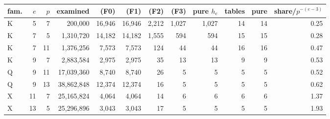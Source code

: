 \begin{tabular}{@{}lrrrrrrrrrrr@{}}
\toprule
fam. & $e$ & $p$ & examined & (F0) & (F1) & (F2) & (F3) & pure $h_e$ & tables & pure & share/$p^{-(e-3)}$\\
\midrule
K & 5 & 7 & 200{,}000 & 16{,}946 & 16{,}946 & 2{,}212 & 1{,}027 & 1{,}027 & 14 & 14 & 0.25\\
K & 7 & 5 & 1{,}310{,}720 & 14{,}182 & 14{,}182 & 1{,}555 & 594 & 594 & 15 & 15 & 0.28\\
K & 7 & 11 & 1{,}376{,}256 & 7{,}573 & 7{,}573 & 124 & 44 & 44 & 16 & 16 & 0.47\\
K & 9 & 7 & 2{,}883{,}584 & 2{,}975 & 2{,}975 & 35 & 13 & 13 & 9 & 9 & 0.53\\
Q & 9 & 11 & 17{,}039{,}360 & 8{,}740 & 8{,}740 & 26 & 5 & 5 & 5 & 5 & 0.52\\
Q & 9 & 13 & 38{,}862{,}848 & 12{,}374 & 12{,}374 & 16 & 5 & 5 & 5 & 5 & 0.62\\
X & 11 & 7 & 25{,}165{,}824 & 4{,}064 & 4{,}064 & 14 & 6 & 6 & 6 & 6 & 1.37\\
X & 13 & 5 & 25{,}296{,}896 & 3{,}043 & 3{,}043 & 17 & 5 & 5 & 5 & 5 & 1.93\\
\bottomrule
\end{tabular}
